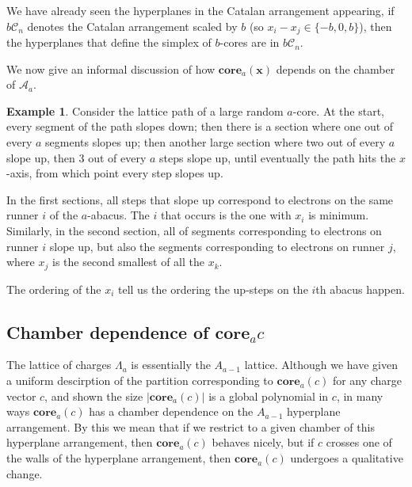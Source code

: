 \documentclass{amsart}[12pt]
\theoremstyle{definition}
\newtheorem{example}[dummy]{Example}
\newcommand{\core}{\mathbf{core}}
\begin{document}
We have already seen the hyperplanes in the Catalan arrangement appearing, if $b\mathcal{C}_n$ denotes the Catalan arrangement scaled by $b$ (so $x_i-x_j\in\{-b,0,b\}$), then the hyperplanes that define the simplex of $b$-cores are in $b\mathcal{C}_n$.







We now give an informal discussion of how $\core_a(\mathbf{x})$ depends on the chamber of $\mathcal{A}_a$.


\begin{example}
Consider the lattice path of a large random $a$-core.  At the start, every segment of the path slopes down; then there is a section where one out of every $a$ segments slopes up; then another large section where two out of every $a$ slope up, then 3 out of every $a$ steps slope up, until eventually the path hits the $x$-axis, from which point every step slopes up.

In the first sections, all steps that slope up correspond to electrons on the same runner $i$ of the $a$-abacus.  The $i$ that occurs is the one with $x_i$ is minimum.  Similarly, in the second section, all of segments corresponding to electrons on runner $i$ slope up, but also the segments corresponding to electrons on runner $j$, where $x_j$ is the second smallest of all the $x_k$.

The ordering of the $x_i$ tell us the ordering the up-steps on the $i$th abacus happen.

\end{example}
\subsection{Chamber dependence of \texorpdfstring{$\core_a{c}$}{core(c)}}

The lattice of charges $\Lambda_a$ is essentially the $A_{a-1}$ lattice.  Although we have given a uniform descirption of the partition corresponding to $\core_a(c)$ for any charge vector $c$, and shown the size $|\core_a(c)|$ is a global polynomial in $c$, in many ways $\core_a(c)$ has a chamber dependence on the $A_{a-1}$ hyperplane arrangement.  By this we mean that if we restrict to a given chamber of this hyperplane arrangement, then $\core_a(c)$ behaves nicely, but if $c$ crosses one of the walls of the hyperplane arrangement, then $\core_a(c)$ undergoes a qualitative change.
\end{document}
